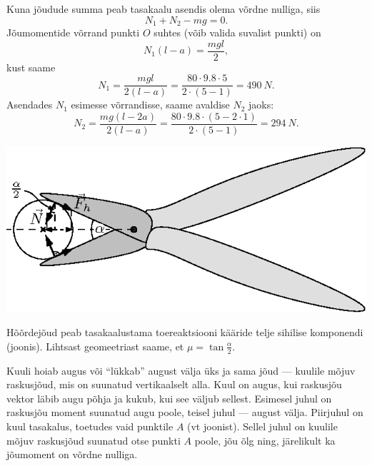 \documentclass[10pt, twoside]{article}
\begin{document}
{Kuna jõudude summa peab tasakaalu asendis olema võrdne nulliga, siis
\[
N_1 + N_2 - mg = 0.
\]
Jõumomentide võrrand punkti $O$ suhtes (võib valida suvalist punkti) on
\[
N_{1}(l-a)=\frac{m g l}{2},
\]
kust saame
\[
N_{1}=\frac{m g l}{2(l-a)}=\frac{80 \cdot \num{9,8} \cdot 5}{2 \cdot(5-1)}=\SI{490}{N}.
\]
Asendades $N_1$ esimesse võrrandisse, saame avaldise $N_2$ jaoks:
\[
N_{2}=\frac{m g(l-2 a)}{2(l-a)}=\frac{80 \cdot \num{9,8} \cdot(5-2 \cdot 1)}{2 \cdot(5-1)}=\SI{294}{N}.
\]
\probend
\bigskip


\solu
\begin{center}
	\includegraphics[width=0.9\linewidth]{2009-v3g-01-G_nyrinenud_kaarid_lah.eps}
\end{center}

Hõõrdejõud peab tasakaalustama toereaktsiooni kääride telje sihilise komponendi (joonis). Lihtsast geomeetriast saame, et $\mu = \tan \frac{\alpha}{2}$.
\probend
\bigskip


\solu
Kuuli hoiab augus või \enquote{lükkab} august välja üks ja sama jõud --- kuulile mõjuv raskusjõud, mis on suunatud vertikaalselt alla. Kuul on augus, kui raskusjõu vektor läbib augu põhja ja kukub, kui see väljub sellest. Esimesel juhul on raskusjõu moment suunatud augu poole, teisel juhul --- august välja. Piirjuhul on kuul tasakalus, toetudes vaid punktile $A$ (vt joonist). Sellel juhul on kuulile mõjuv raskusjõud suunatud otse punkti $A$ poole, jõu õlg ning, järelikult ka jõumoment on võrdne nulliga.

}
\end{document}
